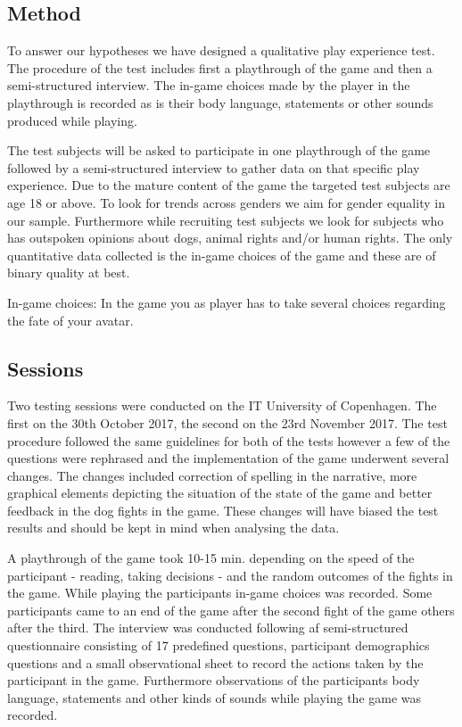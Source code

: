 \subsection{Method}
To answer our hypotheses we have designed a qualitative play experience test. The procedure of the test includes first a playthrough of the game and then a semi-structured interview. The in-game choices made by the player in the playthrough is recorded as is their body language, statements or other sounds produced while playing.

The test subjects will be asked to participate in one playthrough of the game followed by a semi-structured interview to gather data on that specific play experience. Due to the mature content of the game the targeted test subjects are age 18 or above. To look for trends across genders we aim for gender equality in our sample. Furthermore while recruiting test subjects we look for subjects who has outspoken opinions about dogs, animal rights and/or human rights. The only quantitative data collected is the in-game choices of the game and these are of binary quality at best. 

In-game choices:
In the game you as player has to take several choices regarding the fate of your avatar. 

\subsection{Sessions}
Two testing sessions were conducted on the IT University of Copenhagen. The first on the 30th October 2017, the second on the 23rd November 2017. The test procedure followed the same guidelines for both of the tests however a few of the questions were rephrased and the implementation of the game underwent several changes. The changes included correction of spelling in the narrative, more graphical elements depicting the situation of the state of the game and better feedback in the dog fights in the game. These changes will have biased the test results and should be kept in mind when analysing the data.

A playthrough of the game took 10-15 min. depending on the speed of the participant - reading, taking decisions - and the random outcomes of the fights in the game. While playing the participants in-game choices was recorded. Some participants came to an end of the game after the second fight of the game others after the third.
The interview was conducted following af semi-structured questionnaire consisting of 17 predefined questions, participant demographics questions and a small observational sheet to record the actions taken by the participant in the game. Furthermore observations of the participants body language, statements and other kinds of sounds while playing the game was recorded.


